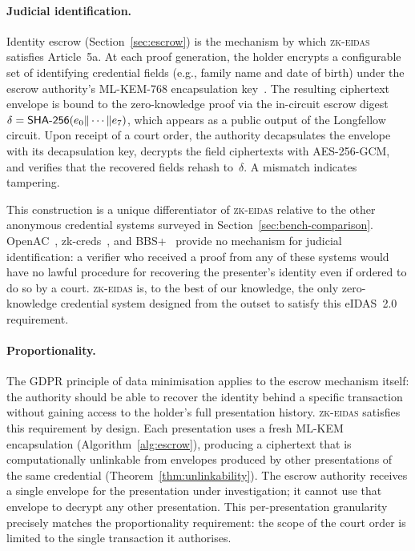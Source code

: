 \paragraph{Judicial identification.}
Identity escrow (Section~\ref{sec:escrow}) is the mechanism by which
\textsc{zk-eidas} satisfies Article~5a.
At each proof generation, the holder encrypts a configurable set of
identifying credential fields (e.g., family name and date of birth)
under the escrow authority's ML-KEM-768 encapsulation key~\cite{fips203}.
The resulting ciphertext envelope is bound to the zero-knowledge proof
via the in-circuit escrow digest
$\delta = \mathsf{SHA\textnormal{-}256}(e_0 \| \cdots \| e_7)$,
which appears as a public output of the Longfellow circuit.
Upon receipt of a court order, the authority decapsulates the envelope
with its decapsulation key, decrypts the field ciphertexts with
AES-256-GCM, and verifies that the recovered fields rehash to~$\delta$.
A mismatch indicates tampering.

This construction is a unique differentiator of \textsc{zk-eidas}
relative to the other anonymous credential systems surveyed in
Section~\ref{sec:bench-comparison}.
OpenAC~\cite{openac}, zk-creds~\cite{zkcreds}, and BBS+~\cite{bbs}
provide no mechanism for judicial identification: a verifier who
received a proof from any of these systems would have no lawful
procedure for recovering the presenter's identity even if ordered to
do so by a court.
\textsc{zk-eidas} is, to the best of our knowledge, the only
zero-knowledge credential system designed from the outset to satisfy
this eIDAS~2.0 requirement.

\paragraph{Proportionality.}
The GDPR principle of data minimisation applies to the escrow
mechanism itself: the authority should be able to recover the identity
behind a specific transaction without gaining access to the holder's
full presentation history.
\textsc{zk-eidas} satisfies this requirement by design.
Each presentation uses a fresh ML-KEM encapsulation
(Algorithm~\ref{alg:escrow}), producing a ciphertext that is
computationally unlinkable from envelopes produced by other
presentations of the same credential
(Theorem~\ref{thm:unlinkability}).
The escrow authority receives a single envelope for the presentation
under investigation; it cannot use that envelope to decrypt any other
presentation.
This per-presentation granularity precisely matches the proportionality
requirement: the scope of the court order is limited to the single
transaction it authorises.

